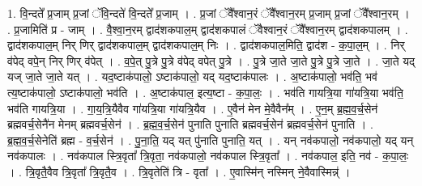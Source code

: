 \documentclass[17pt]{extarticle}
\begin{document}
1. वि॒न्दते᳚ प्र॒जाम् प्र॒जां ॅवि॒न्दते॑ वि॒न्दते᳚ प्र॒जाम् । . प्र॒जां ॅवै᳚श्वान॒रं ॅवै᳚श्वान॒रम् प्र॒जाम् प्र॒जां ॅवै᳚श्वान॒रम् । . प्र॒जामिति॑ प्र - जाम् । . वै॒श्वा॒न॒रम् द्वाद॑शकपाल॒म् द्वाद॑शकपालं ॅवैश्वान॒रं ॅवै᳚श्वान॒रम् द्वाद॑शकपालम् । . द्वाद॑शकपाल॒म् निर् णिर् द्वाद॑शकपाल॒म् द्वाद॑शकपाल॒म् निः । . द्वाद॑शकपाल॒मिति॒ द्वाद॑श - क॒पा॒ल॒म् । . निर् व॑पेद् वपे॒न् निर् णिर् व॑पेत् । . व॒पे॒त् पु॒त्रे पु॒त्रे व॑पेद् वपेत् पु॒त्रे । . पु॒त्रे जा॒ते जा॒ते पु॒त्रे पु॒त्रे जा॒ते । . जा॒ते यद् यज् जा॒ते जा॒ते यत् । . यद॒ष्टाक॑पालो॒ ऽष्टाक॑पालो॒ यद् यद॒ष्टाक॑पालः । . अ॒ष्टाक॑पालो॒ भव॑ति॒ भव॑ त्य॒ष्टाक॑पालो॒ ऽष्टाक॑पालो॒ भव॑ति । . अ॒ष्टाक॑पाल॒ इत्य॒ष्टा - क॒पा॒लः॒ । . भव॑ति गायत्रि॒या गा॑यत्रि॒या भव॑ति॒ भव॑ति गायत्रि॒या । . गा॒य॒त्रि॒यैवैव गा॑यत्रि॒या गा॑यत्रि॒यैव । . ए॒वैन॑ मेन मे॒वैवैन᳚म् । . ए॒न॒म् ब्र॒ह्म॒व॒र्च॒सेन॑ ब्रह्मवर्च॒सेनै॑न मेनम् ब्रह्मवर्च॒सेन॑ । . ब्र॒ह्म॒व॒र्च॒सेन॑ पुनाति पुनाति ब्रह्मवर्च॒सेन॑ ब्रह्मवर्च॒सेन॑ पुनाति । . ब्र॒ह्म॒व॒र्च॒सेनेति॑ ब्रह्म - व॒र्च॒सेन॑ । . पु॒ना॒ति॒ यद् यत् पु॑नाति पुनाति॒ यत् । . यन् नव॑कपालो॒ नव॑कपालो॒ यद् यन् नव॑कपालः । . नव॑कपाल स्त्रि॒वृता᳚ त्रि॒वृता॒ नव॑कपालो॒ नव॑कपाल स्त्रि॒वृता᳚ । . नव॑कपाल॒ इति॒ नव॑ - क॒पा॒लः॒ । . त्रि॒वृतै॒वैव त्रि॒वृता᳚ त्रि॒वृतै॒व । . त्रि॒वृतेति॑ त्रि - वृता᳚ । . ए॒वास्मि॑न् नस्मिन् ने॒वैवास्मिन्न्॑ । \newline
\end{document}
